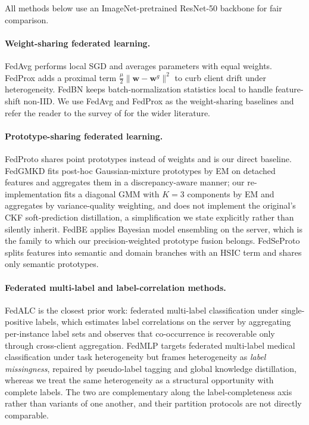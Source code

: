 \documentclass[11pt,a4paper]{article}
\theoremstyle{definition}
\begin{document}
All methods below use an ImageNet-pretrained ResNet-50 backbone \citep{he2016resnet} for fair comparison.

\paragraph{Weight-sharing federated learning.} FedAvg \citep{mcmahan2017fedavg} performs local SGD and averages parameters with equal weights. FedProx \citep{li2020fedprox} adds a proximal term $\frac{\mu}{2}\|\mathbf{w}-\mathbf{w}^{g}\|^{2}$ to curb client drift under heterogeneity. FedBN \citep{li2021fedbn} keeps batch-normalization statistics local to handle feature-shift non-IID. We use FedAvg and FedProx as the weight-sharing baselines and refer the reader to the survey of \citep{kairouz2021advances} for the wider literature.

\paragraph{Prototype-sharing federated learning.} FedProto \citep{tan2022fedproto} shares point prototypes instead of weights and is our direct baseline. FedGMKD \citep{zhang2024fedgmkd} fits post-hoc Gaussian-mixture prototypes by EM on detached features and aggregates them in a discrepancy-aware manner; our re-implementation fits a diagonal GMM with $K{=}3$ components by EM and aggregates by variance-quality weighting, and does not implement the original's CKF soft-prediction distillation, a simplification we state explicitly rather than silently inherit. FedBE \citep{chen2021fedbe} applies Bayesian model ensembling on the server, which is the family to which our precision-weighted prototype fusion belongs. FedSeProto \citep{fedseproto2024} splits features into semantic and domain branches with an HSIC term and shares only semantic prototypes.

\paragraph{Federated multi-label and label-correlation methods.} FedALC \citep{an2024fedalc} is the closest prior work: federated multi-label classification under single-positive labels, which estimates label correlations on the server by aggregating per-instance label sets and observes that co-occurrence is recoverable only through cross-client aggregation. FedMLP \citep{sun2024fedmlp} targets federated multi-label medical classification under task heterogeneity but frames heterogeneity as \emph{label missingness}, repaired by pseudo-label tagging and global knowledge distillation, whereas we treat the same heterogeneity as a structural opportunity with complete labels. The two are complementary along the label-completeness axis rather than variants of one another, and their partition protocols are not directly comparable.
\end{document}
